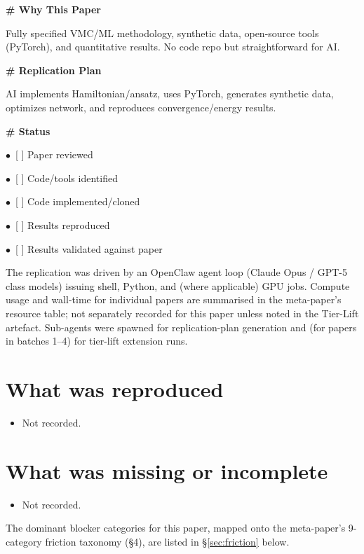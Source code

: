 \documentclass[11pt]{article}
\begin{document}
\par\medskip\textbf{\# Why This Paper}\par
Fully specified VMC/ML methodology, synthetic data, open-source tools (PyTorch), and quantitative results. No code repo but straightforward for AI.

\par\medskip\textbf{\# Replication Plan}\par
AI implements Hamiltonian/ansatz, uses PyTorch, generates synthetic data, optimizes network, and reproduces convergence/energy results.

\par\medskip\textbf{\# Status}\par
\par$\bullet$\ [ ] Paper reviewed
\par$\bullet$\ [ ] Code/tools identified
\par$\bullet$\ [ ] Code implemented/cloned
\par$\bullet$\ [ ] Results reproduced
\par$\bullet$\ [ ] Results validated against paper
\normalsize

The replication was driven by an OpenClaw agent loop (Claude Opus / GPT-5 class models) issuing shell, Python, and (where applicable) GPU jobs. Compute usage and wall-time for individual papers are summarised in the meta-paper's resource table; not separately recorded for this paper unless noted in the Tier-Lift artefact. Sub-agents were spawned for replication-plan generation and (for papers in batches 1--4) for tier-lift extension runs.

\section{What was reproduced}
\begin{itemize}
\item Not recorded.
\end{itemize}

\section{What was missing or incomplete}
\begin{itemize}
\item Not recorded.
\end{itemize}
The dominant blocker categories for this paper, mapped onto the meta-paper's 9-category friction taxonomy (\S4), are listed in \S\ref{sec:friction} below.
\end{document}
